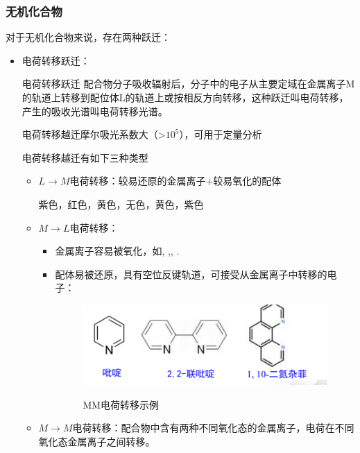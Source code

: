\subsubsection*{无机化合物}
对于无机化合物来说，存在两种跃迁：
\begin{itemize}
    \item 电荷转移跃迁：
    \begin{definition*}{电荷转移跃迁}
        配合物分子吸收辐射后，分子中的电子从主要定域在金属离子M的轨道上转移到配位体L的轨道上或按相反方向转移，这种跃迁叫电荷转移，产生的吸收光谱叫电荷转移光谱。
    \end{definition*}
    \begin{note}
        电荷转移越迁摩尔吸光系数大（>$10^{5}$），可用于定量分析
    \end{note}
    电荷转移越迁有如下三种类型
    \begin{itemize}
        \item $L\rightarrow M$电荷转移：较易还原的金属离子+较易氧化的配体
        \begin{example}
             紫色，红色，黄色，无色，黄色，紫色
        \end{example}
        \item $M\rightarrow L$电荷转移：
        \begin{itemize}
            \item 金属离子容易被氧化，如, ,, .
            \item 配体易被还原，具有空位反键轨道，可接受从金属离子中转移的电子：
            \begin{figure}[h]
                \centering
                \includegraphics[width=10cm]{image/chp3_L.png}
                \label{fig:chp3L}
                \caption{MM电荷转移示例}
            \end{figure}
        \end{itemize}
        \item $M\rightarrow M$电荷转移：配合物中含有两种不同氧化态的金属离子，电荷在不同氧化态金属离子之间转移。
        \begin{figure}[h]

\end{figure}
\end{itemize}
\end{itemize}
